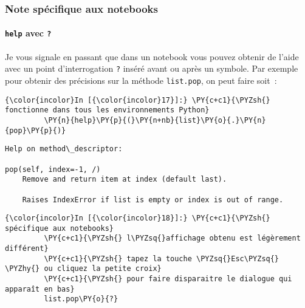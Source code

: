     \hypertarget{note-spuxe9cifique-aux-notebooks}{%
\subsubsection{Note spécifique aux
notebooks}\label{note-spuxe9cifique-aux-notebooks}}

    \hypertarget{help-avec}{%
\paragraph{\texorpdfstring{\texttt{help} avec
\texttt{?}}{help avec ?}}\label{help-avec}}

    Je vous signale en passant que dans un notebook vous pouvez obtenir de
l'aide avec un point d'interrogation \texttt{?} inséré avant ou après un
symbole. Par exemple pour obtenir des précisions sur la méthode
\texttt{list.pop}, on peut faire soit~:

    \begin{Verbatim}[commandchars=\\\{\},frame=single,framerule=0.3mm,rulecolor=\color{cellframecolor}]
{\color{incolor}In [{\color{incolor}17}]:} \PY{c+c1}{\PYZsh{} fonctionne dans tous les environnements Python}
         \PY{n}{help}\PY{p}{(}\PY{n+nb}{list}\PY{o}{.}\PY{n}{pop}\PY{p}{)}
\end{Verbatim}


    \begin{Verbatim}[commandchars=\\\{\},frame=single,framerule=0.3mm,rulecolor=\color{cellframecolor}]
Help on method\_descriptor:

pop(self, index=-1, /)
    Remove and return item at index (default last).
    
    Raises IndexError if list is empty or index is out of range.
\end{Verbatim}

    \begin{Verbatim}[commandchars=\\\{\},frame=single,framerule=0.3mm,rulecolor=\color{cellframecolor}]
{\color{incolor}In [{\color{incolor}18}]:} \PY{c+c1}{\PYZsh{} spécifique aux notebooks}
         \PY{c+c1}{\PYZsh{} l\PYZsq{}affichage obtenu est légèrement différent}
         \PY{c+c1}{\PYZsh{} tapez la touche \PYZsq{}Esc\PYZsq{} \PYZhy{} ou cliquez la petite croix}
         \PY{c+c1}{\PYZsh{} pour faire disparaitre le dialogue qui apparaît en bas}
         list.pop\PY{o}{?}
\end{Verbatim}


